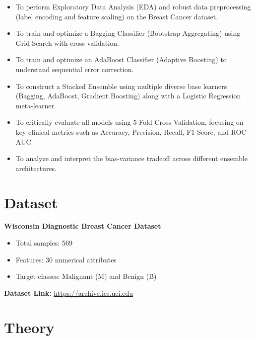 \documentclass[11pt]{article}
\begin{document}
\begin{itemize}
    \item To perform Exploratory Data Analysis (EDA) and robust data preprocessing (label encoding and feature scaling) on the Breast Cancer dataset.
    
    \item To train and optimize a Bagging Classifier (Bootstrap Aggregating) using Grid Search with cross-validation.
    
    \item To train and optimize an AdaBoost Classifier (Adaptive Boosting) to understand sequential error correction.
    
    \item To construct a Stacked Ensemble using multiple diverse base learners (Bagging, AdaBoost, Gradient Boosting) along with a Logistic Regression meta-learner.
    
    \item To critically evaluate all models using 5-Fold Cross-Validation, focusing on key clinical metrics such as Accuracy, Precision, Recall, F1-Score, and ROC-AUC.
    
    \item To analyze and interpret the bias-variance tradeoff across different ensemble architectures.
\end{itemize}


\section{Dataset}
\textbf{Wisconsin Diagnostic Breast Cancer Dataset}

\begin{itemize}
    \item Total samples: 569
    \item Features: 30 numerical attributes
    \item Target classes: Malignant (M) and Benign (B)
\end{itemize}

\textbf{Dataset Link:}  
\href{https://archive.ics.uci.edu/dataset/17/breast+cancer+wisconsin+diagnostic}{https://archive.ics.uci.edu}


\section{Theory}
\end{document}
